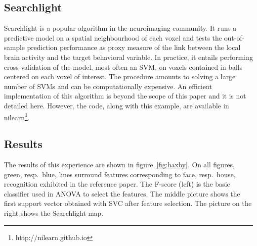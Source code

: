 \documentclass{frontiersSCNS} %
\begin{document}



\subsection{Searchlight}
\label{searchlight}

Searchlight \citep{kriegeskorte2006} is a popular algorithm in the
neuroimaging community. It runs a predictive model on a spatial
neighbourhood of each voxel and tests the out-of-sample prediction
performance as proxy measure of the link between the local brain activity
and the target behavioral variable. In practice, it entails performing
cross-validation of the model, most often an SVM, on voxels contained in
balls centered on each voxel of interest. The procedure amounts to
solving a large number of SVMs and can be computationally expensive.
An efficient implementation of this algorithm is beyond the scope of this
paper and it is not detailed here. However, the code, along with this example,
are available in nilearn\footnote{http://nilearn.github.io}.

\subsection{Results}

The results of this experience are shown in figure~\ref{fig:haxby}.
On all figures, green, resp.\ blue,
lines surround features corresponding to face, resp.\ house, recognition
exhibited in the reference paper.
The F-score (left) is the basic
classifier used in ANOVA to select the features. The middle picture shows the
first support vector obtained with SVC after feature selection. The picture on
the right shows the Searchlight map.
\end{document}
